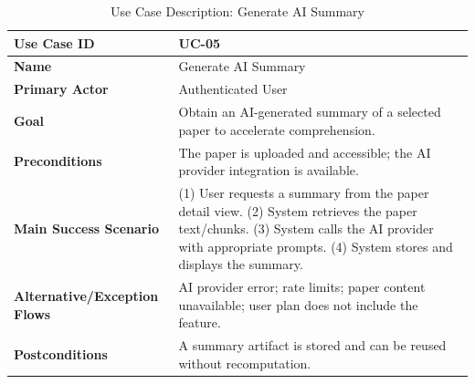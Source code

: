 \begin{table}[H]
    \centering
    \small
    \begin{tabularx}{\textwidth}{|l|X|}
        \hline
        \textbf{Use Case ID}                 & UC-05                                                                                                                                                                                                      \\
        \hline
        \textbf{Name}                        & Generate AI Summary                                                                                                                                                                                        \\
        \hline
        \textbf{Primary Actor}               & Authenticated User                                                                                                                                                                                         \\
        \hline
        \textbf{Goal}                        & Obtain an AI-generated summary of a selected paper to accelerate comprehension.                                                                                                                            \\
        \hline
        \textbf{Preconditions}               & The paper is uploaded and accessible; the AI provider integration is available.                                                                                                                            \\
        \hline
        \textbf{Main Success Scenario}       & (1) User requests a summary from the paper detail view. (2) System retrieves the paper text/chunks. (3) System calls the AI provider with appropriate prompts. (4) System stores and displays the summary. \\
        \hline
        \textbf{Alternative/Exception Flows} & AI provider error; rate limits; paper content unavailable; user plan does not include the feature.                                                                                                         \\
        \hline
        \textbf{Postconditions}              & A summary artifact is stored and can be reused without recomputation.                                                                                                                                      \\
        \hline
    \end{tabularx}
    \caption{Use Case Description: Generate AI Summary}
    \label{tab:uc-05}
\end{table}

